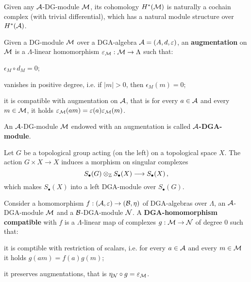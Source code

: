 	\begin{ex}
		Given any $\mathcal{A}$-DG-module $\mathcal{M}$, its cohomology $H^{*}(\mathcal{M})$ is naturally
		a cochain complex (with trivial differential), which has a natural module structure
		over %
		$H^*(\mathcal{A})$.
	\end{ex}
	
	\begin{df}
		Given a DG-module $\mathcal{M}$ over a DGA-algebra $\mathcal{A}=(A,d,\varepsilon)$,
		an \textbf{augmentation} on $\mathcal{M}$ is a $\Lambda$-linear homomorphism
		$\varepsilon_{\mathcal{M}}:\mathcal{M} \to \Lambda$ such that:
		\begin{rmnumerate}
			\item $\epsilon_{M} \circ d_{M} = 0$;
			\item vanishes in positive degree, i.e. if $|m|>0$, then $\epsilon_{M}(m) = 0$;
			\item it is compatible with augmentation on $\mathcal{A}$, that is
			for every $a \in \mathcal{A}$ and every $m \in \mathcal{M}$, 
			it holds $\varepsilon_{\mathcal{M}}(am) = \varepsilon(a)\varepsilon_{\mathcal{M}}(m)$.
		\end{rmnumerate}
		An $\mathcal{A}$-DG-module $\mathcal{M}$ endowed with an augmentation is called \textbf{$\mathcal{A}$-DGA-module}.
	\end{df}	
	
	\begin{ex}
		Let $G$ be a topological group acting (on the left) on a topological space $X$.
		The action $G \times X \to X$ induces a morphism on singular complexes
		\begin{equation*}
			S_{\bullet}(G) \otimes_{{\mathbb Z}} S_{\bullet}(X) \longrightarrow S_{\bullet}(X)\,,
		\end{equation*}
		which makes $S_{\bullet}(X)$ into a left DGA-module over $S_{\bullet}(G)$.
	\end{ex}
	
	\begin{df}
		Consider a homomorphism $f:(\mathcal{A},\varepsilon) \to (\mathcal{B}, \eta)$ of DGA-algebras over $\Lambda$,
		an $\mathcal{A}$-DGA-module $\mathcal{M}$ and a $\mathcal{B}$-DGA-module $\mathcal{N}$.
		A \textbf{DGA-homomorphism compatible} with $f$ is a $\Lambda$-linear
		map of complexes $g:\mathcal{M} \to \mathcal{N}$ of degree $0$ such that: 
		\begin{rmnumerate}
			\item it is comptible with restriction of scalars, i.e. for every $a \in \mathcal{A}$
			and every $m \in \mathcal{M}$ it holds $g(am) = f(a)g(m)$;
			\item it preserves augmentations, that is $\eta_{\mathcal{N}} \circ g = \varepsilon_{\mathcal{M}}$.
		\end{rmnumerate}
	\end{df}
	
